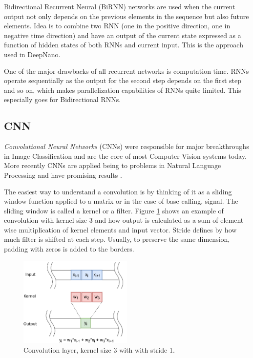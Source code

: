 \documentclass[times, utf8, diplomski, numeric, english]{fer}
\begin{document}
Bidirectional Recurrent Neural (BiRNN) networks are used when the current output not only depends on the previous elements in the sequence but also future elements. Idea is to combine two RNN (one in the positive direction, one in negative time direction) and have an output of the current state expressed as a function of hidden states of both RNNs and current input. This is the approach used in DeepNano\cite{Boza2017}. 


One of the major drawbacks of all recurrent networks is computation time. RNNs operate sequentially as the output for the second step depends on the first step and so on, which makes parallelization capabilities of RNNs quite limited. This especially goes for Bidirectional RNNs.

\subsection{CNN}

\textit{Convolutional Neural Networks }(CNNs) were responsible for major breakthroughs in Image Classification and are the core of most Computer Vision systems today. More recently CNNs are applied being to problems in Natural Language Processing and have promising results \cite{bytenet}\cite{facebook}.

The easiest way to understand a convolution is by thinking of it as a sliding window function applied to a matrix or in the case of base calling, signal. The sliding window is called a kernel or a filter.  Figure \ref{fg:convolution} shows an example of convolution with kernel size 3 and how output is calculated as a sum of element-wise multiplication of kernel elements and input vector. Stride defines by how much filter is shifted at each step. Usually, to preserve the same dimension, padding with zeros is added to the borders. 

\begin{figure}[H]
	\begin{center}
		\includegraphics[width=0.5\textwidth]{./imgs/convolution.png}
		\caption{Convolution layer, kernel size 3 with with stride 1.}
		\label{fg:convolution}
	\end{center}
\end{figure}
\end{document}
